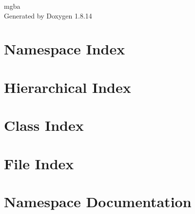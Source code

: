 \documentclass[twoside]{book}
\newcommand{\+}{\discretionary{\mbox{\scriptsize$\hookleftarrow$}}{}{}}
\newcommand{\clearemptydoublepage}{%
  \newpage{\pagestyle{empty}\cleardoublepage}%
}
\begin{document}
\hypersetup{pageanchor=false,
             bookmarksnumbered=true,
             pdfencoding=unicode
            }
\begin{titlepage}
\vspace*{7cm}
\begin{center}%
{\Large mgba }\\
\vspace*{1cm}
{\large Generated by Doxygen 1.8.14}\\
\end{center}
\end{titlepage}
\clearemptydoublepage
{}
\tableofcontents
\clearemptydoublepage
{}
\hypersetup{pageanchor=true}

\chapter{Namespace Index}

\chapter{Hierarchical Index}

\chapter{Class Index}

\chapter{File Index}

\chapter{Namespace Documentation}

\end{document}
